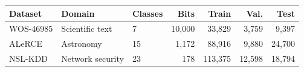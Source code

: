\begin{tabular}{lllrrrr}
\toprule
Dataset & Domain & Classes & Bits & Train & Val. & Test \\
\midrule
WOS-46985 & Scientific text & 7 & 10,000 & 33,829 & 3,759 & 9,397 \\
ALeRCE & Astronomy & 15 & 1,172 & 88,916 & 9,880 & 24,700 \\
NSL-KDD & Network security & 23 & 178 & 113,375 & 12,598 & 18,794 \\
\bottomrule
\end{tabular}
